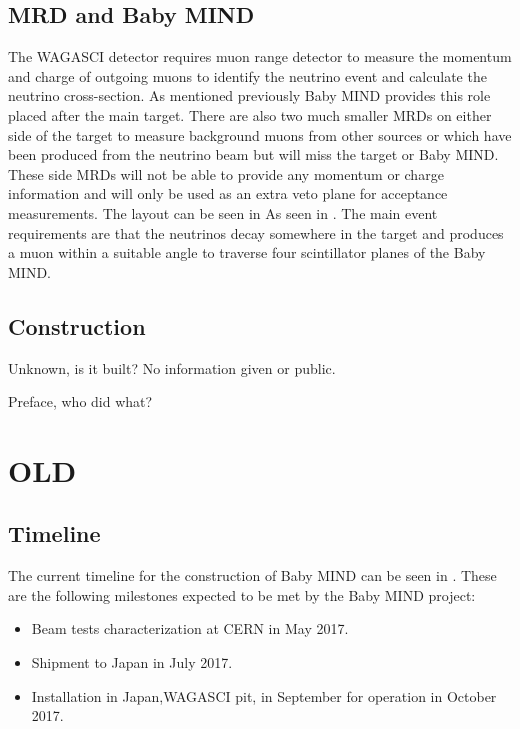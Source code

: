 \subsection{MRD and Baby MIND}
The WAGASCI detector requires muon range detector to measure the momentum and charge of outgoing muons to identify the neutrino event and calculate the neutrino cross-section. As mentioned previously Baby MIND provides this role placed after the main target. There are also two much smaller MRDs on either side of the target to measure background muons from other sources or which have been produced from the neutrino beam but will miss the target or Baby MIND. These side MRDs will not be able to provide any momentum or charge information and will only be used as an extra veto plane for acceptance measurements. The layout can be seen in As seen in . The main event requirements are that the neutrinos decay somewhere in the target and produces a muon within a suitable angle to traverse four scintillator planes of the Baby MIND.

\subsection{Construction}
Unknown, is it built? No information given or public.

Preface, who did what?
\section{OLD}
\subsection{Timeline}
The current timeline for the construction of Baby MIND can be seen in .
These are the following milestones expected to be met by the Baby MIND project:
\begin{itemize}
\item Beam tests characterization at CERN in May 2017.
\item Shipment to Japan in July 2017.
\item Installation in Japan,WAGASCI pit, in September for operation in October 2017.
\end{itemize}

